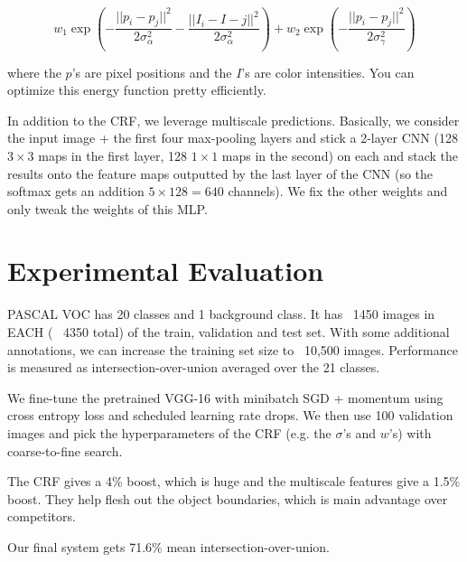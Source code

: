 \documentclass[a4paper]{article}
\begin{document}
$$
w_1 \exp(- \frac{||p_i - p_j||^2}{2 \sigma^2_{\alpha}} - \frac{||I_i - I-j||^2}{
2 \sigma^2_{\alpha}
}) + w_2 \exp(-\frac{||p_i - p_j||^2}{2 \sigma^2_{\gamma}})
$$

where the $p$'s are pixel positions and the $I$'s are color intensities. You can
optimize this energy function pretty efficiently.

In addition to the CRF, we leverage multiscale predictions. Basically, we
consider the input image + the first four max-pooling layers and stick a 2-layer
CNN (128 $3 \times 3$ maps in the first layer, 128 $1 \times 1$ maps in the
second) on each and stack the results onto the feature maps outputted by
the last layer of the CNN (so the softmax gets an addition $5 \times 128 =
640$ channels). We fix the other weights and only tweak the weights of this
MLP.

\section{Experimental Evaluation}
PASCAL VOC has 20 classes and 1 background class. It has ~1450 images in EACH (
~4350 total) of the train, validation and test set. With some additional
annotations, we can increase the training set size to ~10,500 images.
Performance is measured as intersection-over-union averaged over the 21 classes.

We fine-tune the pretrained VGG-16 with minibatch SGD + momentum using cross
entropy loss and scheduled learning rate drops. We then use 100 validation
images and pick the hyperparameters of the CRF (e.g. the $\sigma$'s and
$w$'s) with coarse-to-fine search.

The CRF gives a 4\% boost, which is huge and the multiscale features give a
1.5\% boost. They help flesh out the object boundaries, which is main advantage
over competitors.

Our final system gets 71.6\% mean intersection-over-union.
\end{document}
